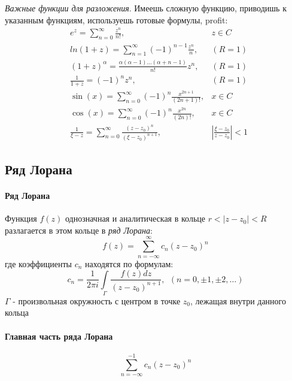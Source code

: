 \documentclass[12pt]{extarticle}
\begin{document}
\textit{Важные функции для разложения}. Имеешь сложную функцию,
приводишь к указанным функциям, используешь готовые формулы, profit:
\begin{eqnarray*}
   &e^{z}=\sum\limits_{n=0}^{\infty}\frac{z^{n}}{n!},&z\in C\\
   &ln(1+z)=\sum\limits_{n=1}^{\infty}(-1)^{n-1}\frac{z^{n}}{n},& (R=1)\\
   &(1+z)^{\alpha}=\frac{\alpha(\alpha-1)\ldots
    (\alpha+n-1)}{n!}z^{n},&(R=1)\\
   &\frac{1}{1+z}=(-1)^{n}z^{n},&(R=1)\\
   &\sin(x)=\sum\limits_{n=0}^{\infty}
    (-1)^{n}\frac{x^{2n+1}}{(2n+1)!},&x\in C \\
   &\cos(x)=\sum\limits_{n=0}^{\infty}
    (-1)^{n}\frac{x^{2n}}{(2n)!},&x\in C\\
   &\frac{1}{\xi-z}=\sum\limits_{n=0}^{\infty}
    \frac{(z-z_{0})^{n}}{(\xi-z_{0})^{n+1}}, &
    \left|\frac{\xi-z_{0}}{z-z_{0}}\right|<1
\end{eqnarray*}

\subsection{Ряд Лорана}
\paragraph{Ряд Лорана}
Функция $f(z)$ однозначная и аналитическая в кольце
$r<\left|z-z_{0}\right|<R$ разлагается в этом кольце в \textit{ряд Лорана}:
\begin{displaymath}
    f(z)=\sum\limits_{n=-\infty}^{\infty}c_{n}(z-z_{0})^{n}
\end{displaymath}
где коэффициенты $c_{n}$ находятся по формулам:
\begin{displaymath}
    c_{n}=\frac{1}{2\pi
    i}\int\limits_{\Gamma}\frac{f(z)dz}{(z-z_{0})^{n+1}},
    \ \ (n=0,\pm1,\pm2,\ldots)
\end{displaymath}
$\Gamma$ - произвольная окружность с центром в точке $z_{0}$, лежащая
внутри данного кольца

\paragraph{Главная часть ряда Лорана}
\begin{displaymath}
    \sum\limits_{n=-\infty}^{-1}c_{n}(z-z_{0})^{n}
\end{displaymath}
\end{document}
